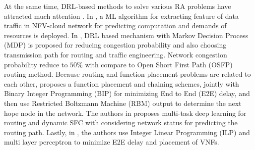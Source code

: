 \documentclass[20pt,twocolumn]{IEEEtran}
\begin{document}
At the same time,
 DRL-based methods to solve various RA problems have attracted much attention \cite{mao2018deep, li2018deep, ayoubi2018machine}. 
 In \cite{zorello2018improving}, a ML algorithm for extracting feature of data traffic in NFV-cloud network for predicting  computation and demands of resources is deployed. 
In \cite{ding2019deep},  DRL based mechanism with Markov Decision Process (MDP) is proposed for reducing congestion probability and also choosing  transmission path for routing and traffic engineering. Network congestion probability reduce to $50\%$ with compare to Open Short First Path (OSFP) routing method. Because  routing and function placement problems  are related to each other, \cite{pei2018virtual} proposes a function placement and chaining schemes, jointly with  Binary Integer Programming (BIP) for minimizing End to End (E2E) delay, and then use Restricted Boltzmann Machine (RBM) output to  determine the next hope node in the network. The authors in \cite{zhou2019multi} proposes  multi-task deep learning for routing and dynamic SFC with considering network status for predicting  the routing path. Lastly, in \cite{subramanya2019machine}, the  authors use Integer Linear Programming (ILP) and multi layer perceptron  to minimize E2E delay and placement of VNFs.  
\end{document}
